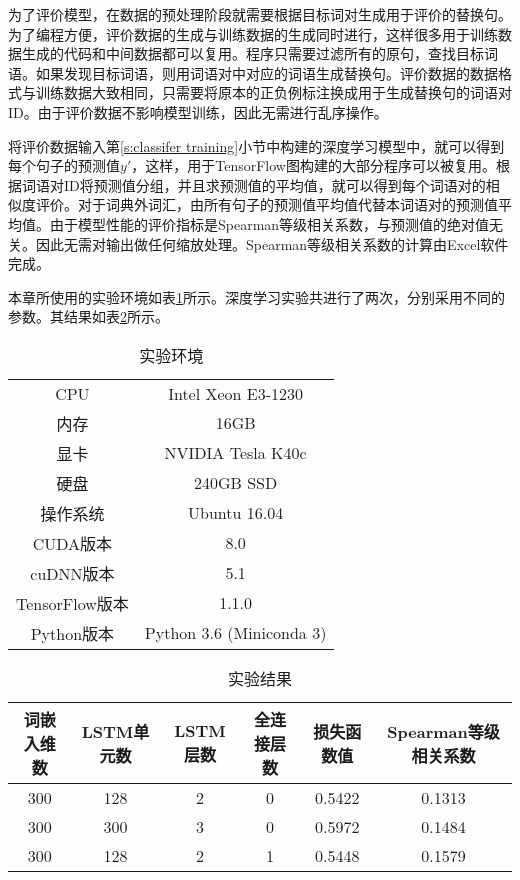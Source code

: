 为了评价模型，在数据的预处理阶段就需要根据目标词对生成用于评价的替换句。为了编程方便，评价数据的生成与训练数据的生成同时进行，这样很多用于训练数据生成的代码和中间数据都可以复用。程序只需要过滤所有的原句，查找目标词语。如果发现目标词语，则用词语对中对应的词语生成替换句。评价数据的数据格式与训练数据大致相同，只需要将原本的正负例标注换成用于生成替换句的词语对ID。由于评价数据不影响模型训练，因此无需进行乱序操作。

将评价数据输入第\ref{s:classifer training}小节中构建的深度学习模型中，就可以得到每个句子的预测值$y'$，这样，用于TensorFlow图构建的大部分程序可以被复用。根据词语对ID将预测值分组，并且求预测值的平均值，就可以得到每个词语对的相似度评价。对于词典外词汇，由所有句子的预测值平均值代替本词语对的预测值平均值。由于模型性能的评价指标是Spearman等级相关系数，与预测值的绝对值无关。因此无需对输出做任何缩放处理。Spearman等级相关系数的计算由Excel软件完成。

本章所使用的实验环境如表\ref{t:environment}所示。深度学习实验共进行了两次，分别采用不同的参数。其结果如表\ref{t:classifer result}所示。
\begin{table}[h]
	\caption{实验环境}
	\label{t:environment}
	\vspace{0.5em}\centering\wuhao
	\begin{tabular}{cc}
		\toprule[1.5pt]
		CPU & Intel Xeon E3-1230 \\
		内存 & 16GB \\
		显卡 & NVIDIA Tesla K40c \\
		硬盘 & 240GB SSD \\
		操作系统 & Ubuntu 16.04 \\
		CUDA版本 & 8.0 \\
		cuDNN版本 & 5.1 \\
		TensorFlow版本 & 1.1.0 \\
		Python版本 & Python 3.6 (Miniconda 3) \\
		\bottomrule[1.5pt]
	\end{tabular}
\end{table}

\begin{table}[h]
	\caption{实验结果}
	\label{t:classifer result}
	\vspace{0.5em}\centering\wuhao
	\begin{tabular}{cccccc}
		\toprule[1.5pt]
		词嵌入维数 & LSTM单元数 & LSTM层数 & 全连接层数 & 损失函数值 & Spearman等级相关系数 \\
		\midrule[1pt]
		300 & 128 & 2 & 0 & 0.5422 & 0.1313 \\
		300 & 300 & 3 & 0 & 0.5972 & 0.1484 \\
		300 & 128 & 2 & 1 & 0.5448 & 0.1579 \\
		\bottomrule[1.5pt]
	\end{tabular}
\end{table}